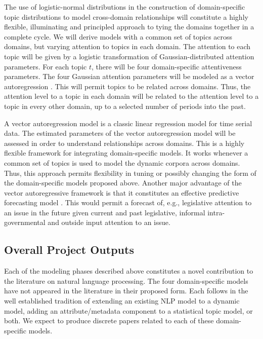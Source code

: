The use of logistic-normal distributions in the construction of domain-specific topic distributions to model cross-domain relationships will constitute a highly flexible, illuminating and principled approach to tying the domains together in a complete cycle. We will derive models with a common set of topics across domains, but varying attention to topics in each domain. The attention to each topic will be given by a logistic transformation of Gaussian-distributed attention parameters. For each topic $t$, there will be four domain-specific attentiveness parameters. The four Gaussian attention parameters will be modeled as a vector autoregression \cite{Banbura2010}. This will permit topics to be related across domains. Thus, the attention level to a topic in each domain will be related to the attention level to a topic in every other domain, up to a selected number of periods into the past. 

A vector autoregression model is a classic linear regression model for time serial data. The estimated parameters of the vector autoregression model will be assessed in order to understand relationships across domains. This is a highly flexible framework for integrating domain-specific models. It works whenever a common set of topics is used to model the dynamic corpora across domains. Thus, this approach permits flexibility in tuning or possibly changing the form of the domain-specific models proposed above. Another major advantage of the vector autoregressive framework is that it constitutes an effective predictive forecasting model \cite{Banbura2010}. This would permit a forecast of, e.g., legislative attention to an issue in the future given current and past legislative, informal intra-governmental and outside input attention to an issue.

\subsection{Overall Project Outputs}

Each of the modeling phases described above constitutes a novel contribution to the literature on natural language processing. The four domain-specific models have not appeared in the literature in their proposed form. Each follows in the well established tradition of extending an existing NLP model to a dynamic model, adding an attribute/metadata component to a statistical topic model, or both. We expect to produce discrete papers related to each of these domain-specific models. 

